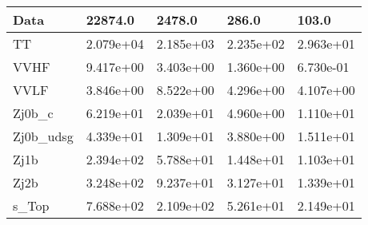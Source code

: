 \begin{table}
{\begin{tabularx}{\textwidth}{|X|X|X|X|X|}
\hline
Data & 22874.0 & 2478.0 & 286.0 & 103.0 \\
\hline
TT & 2.079e+04 & 2.185e+03 & 2.235e+02 & 2.963e+01 \\
VVHF & 9.417e+00 & 3.403e+00 & 1.360e+00 & 6.730e-01 \\
VVLF & 3.846e+00 & 8.522e+00 & 4.296e+00 & 4.107e+00 \\
Zj0b\_c & 6.219e+01 & 2.039e+01 & 4.960e+00 & 1.110e+01 \\
Zj0b\_udsg & 4.339e+01 & 1.309e+01 & 3.880e+00 & 1.511e+01 \\
Zj1b & 2.394e+02 & 5.788e+01 & 1.448e+01 & 1.103e+01 \\
Zj2b & 3.248e+02 & 9.237e+01 & 3.127e+01 & 1.339e+01 \\
s\_Top & 7.688e+02 & 2.109e+02 & 5.261e+01 & 2.149e+01 \\
\hline
\end{tabularx}
}
\label{tab:cr-Zmm-2017}
\end{table}

